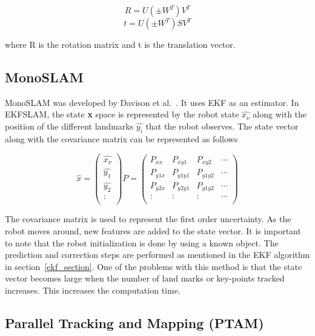 \begin{equation}
	R = U(\pm W^T)V^T
\end{equation}
\begin{equation}	
	t = U(\pm W^T)SV^T
\end{equation}

where R is the rotation matrix and t is the translation vector. 

\subsection{MonoSLAM}

MonoSLAM was developed by Davison et al.~\cite{davison2003real,davison2007monoslam}. It uses EKF as an estimator. In EKFSLAM, the state \textbf{x} space is represented by the robot state $\hat{x_\nu}$ along with the position of the different landmarks $\hat{y_i}$ that the robot observes. The state vector along with the covariance matrix can be represented as follows

\begin{equation}
\hat{x} = 
\begin{pmatrix}
  \hat{x_\nu} \\
  \hat{y_1} \\
  \hat{y_2} \\
  : 	\\
 \end{pmatrix}
P = 
\begin{pmatrix}
  P_{xx} & P_{xy1} & P_{xy2} & \cdots \\
  P_{y1x} & P_{y1y1} & P_{y1y2} & \cdots \\
  P_{y2x} & P_{y2y1} & P_{y1y2} & \cdots \\
  : & :     &     :     & \cdots \\
 \end{pmatrix}
\end{equation}

The covariance matrix is used to represent the first order uncertainty. As the robot moves around, new features are added to the state vector. It is important to note that the robot initialization is done by using a known object. The prediction and correction steps are performed as mentioned in the EKF algorithm in section~\ref{ekf_section}. One of the problems with this method is that the state vector becomes large when the number of land marks or key-points tracked increases. This increases the computation time.

\subsection{Parallel Tracking and Mapping (PTAM)}
\label{ptamtheory}

